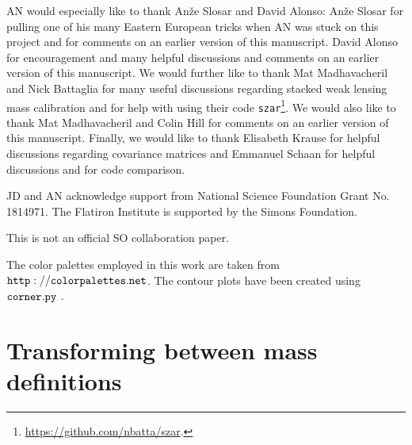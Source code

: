 \documentclass[%
 reprint,
nofootinbib,
 amsmath,amssymb,
 aps,
]{revtex4-1}
\begin{document}
\begin{acknowledgments}
AN would especially like to thank An\v{z}e Slosar and David Alonso: An\v{z}e Slosar for pulling one of his many Eastern European tricks when AN was stuck on this project and for comments on an earlier version of this manuscript. David Alonso for encouragement and many helpful discussions and comments on an earlier version of this manuscript. We would further like to thank Mat Madhavacheril and Nick Battaglia for many useful discussions regarding stacked weak lensing mass calibration and for help with using their code \texttt{szar}\footnote{\url{https://github.com/nbatta/szar}.}. We would also like to thank Mat Madhavacheril and Colin Hill for comments on an earlier version of this manuscript. Finally, we would like to thank Elisabeth Krause for helpful discussions regarding covariance matrices and Emmanuel Schaan for helpful discussions and for code comparison.

JD and AN acknowledge support from National Science Foundation Grant No. 1814971. The Flatiron Institute is supported by the Simons Foundation.

This is not an official SO collaboration paper.

The color palettes employed in this work are taken from $\tt{http://colorpalettes.net}$. The contour plots have been created using $\tt{corner.py}$ \cite{ForemanMackey:2016}.

\end{acknowledgments}

\appendix

\section{Transforming between mass definitions}\label{ap:sec:mass-trans} 
\end{document}
